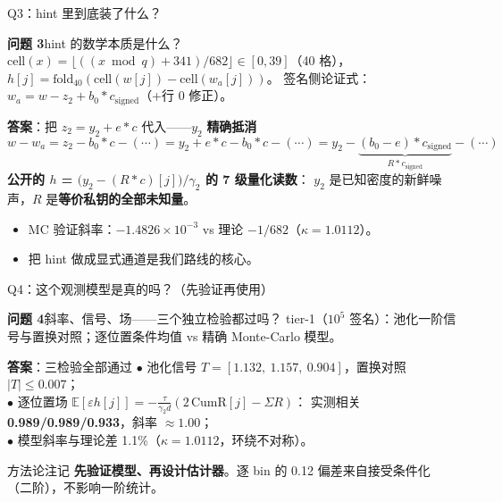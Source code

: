 \documentclass[11pt,aspectratio=169]{ctexbeamer}
\begin{document}
\begin{frame}{Q3：hint 里到底装了什么？}
  \begin{block}{\textbf{问题 3}\quad hint 的数学本质是什么？}
    \small $\mathrm{cell}(x)=\lfloor((x\bmod q)+341)/682\rfloor\in[0,39]$（40 格），
    $h[j]=\mathrm{fold}_{40}(\mathrm{cell}(w[j])-\mathrm{cell}(w_a[j]))$。
    签名侧论证式：$w_a = w - z_2 + b_0*c_{\mathrm{signed}}$（+行 0 修正）。
  \end{block}
  \begin{exampleblock}{\textbf{答案}：把 $z_2 = y_2 + e*c$ 代入——$y_2$ \textbf{精确抵消}}
    \small
    \[
      w - w_a = z_2 - b_0*c - (\cdots)
      = y_2 + e*c - b_0*c - (\cdots)
      = y_2 - \underbrace{(b_0-e)*c_{\mathrm{signed}}}_{R*c_{\mathrm{signed}}} - (\cdots)
    \]
    \textbf{公开的 $h$ = $\bigl(y_2 - (R*c)[j]\bigr)/\gamma_2$ 的 7 级量化读数}：
    $y_2$ 是已知密度的新鲜噪声，$R$ 是\textbf{等价私钥的全部未知量}。
  \end{exampleblock}
  \begin{itemize}
    \item MC 验证斜率：$-1.4826\times10^{-3}$ vs 理论 $-1/682$（$\kappa=1.0112$）。
    \item 把 hint 做成显式通道是我们路线的核心。
  \end{itemize}
\end{frame}

\begin{frame}{Q4：这个观测模型是真的吗？（先验证再使用）}
  \begin{block}{\textbf{问题 4}\quad 斜率、信号、场——三个独立检验都过吗？}
    \small tier-1（$10^5$ 签名）：池化一阶信号与置换对照；逐位置条件均值 vs
    精确 Monte-Carlo 模型。
  \end{block}
  \begin{exampleblock}{\textbf{答案}：三检验全部通过}
    \small
    $\bullet$ 池化信号 $T=[1.132,\ 1.157,\ 0.904]$，置换对照 $|T|\le0.007$；\\
    $\bullet$ 逐位置场 $\mathbb{E}[\varepsilon h[j]] =
    -\frac{\tau}{\gamma_2 d}(2\,\mathrm{CumR}[j]-\Sigma R)$：
    实测相关 \textbf{0.989/0.989/0.933}，斜率 $\approx1.00$；\\
    $\bullet$ 模型斜率与理论差 1.1\%（$\kappa=1.0112$，环绕不对称）。
  \end{exampleblock}
  \begin{block}{方法论注记}
    \small \textbf{先验证模型、再设计估计器}。逐 bin 的 0.12 偏差来自接受条件化
    （二阶），不影响一阶统计。
  \end{block}
\end{frame}
\end{document}
